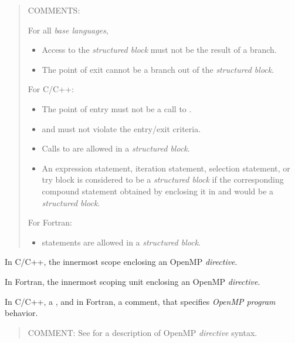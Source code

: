 \begin{quote}
COMMENTS:

For all \emph{base languages},

\begin{itemize}
\item Access to the \emph{structured block} must not be the result of a branch.

\item The point of exit cannot be a branch out of the \emph{structured block}.
\end{itemize}

For C/C++:

\begin{itemize}
\item The point of entry must not be a call to .

\item {} and  must not violate the entry/exit criteria.

\item Calls to  are allowed in a \emph{structured block}.

\item An expression statement, iteration statement, selection statement, 
or try block is considered to be a \emph{structured block} if the 
corresponding compound statement obtained by enclosing it in \code{\{} 
and \code{\}} would be a \emph{structured block}.
\end{itemize}

For Fortran:

\begin{itemize}
\item {} statements are allowed in a \emph{structured block}.
\end{itemize}
\end{quote}
\glossarydefend


\glossarydefstart
In C/C++, the innermost scope enclosing an OpenMP \emph{directive}.

In Fortran, the innermost scoping unit enclosing an OpenMP \emph{directive}.
\glossarydefend

\glossarydefstart
In C/C++, a , and in Fortran, a comment, that specifies \emph{OpenMP
program} behavior.

\begin{quote}
COMMENT: See  for a description of OpenMP \emph{directive} syntax.
\end{quote}
\glossarydefend


